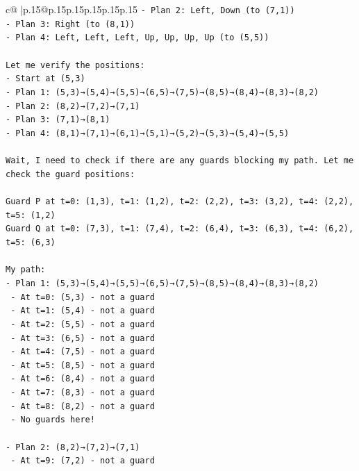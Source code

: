 \documentclass{article}
\begin{document}
{\begin{supertabular}{c@{$\;$}|p{.15\linewidth}@{}p{.15\linewidth}p{.15\linewidth}p{.15\linewidth}p{.15\linewidth}p{.15\linewidth}}
{{{\texttt{{-} Plan 2: Left, Down (to (7,1))} \\
\texttt{{-} Plan 3: Right (to (8,1))} \\
\texttt{{-} Plan 4: Left, Left, Left, Up, Up, Up, Up (to (5,5))} \\
\\ 
\texttt{Let me verify the positions:} \\
\texttt{{-} Start at (5,3)} \\
\texttt{{-} Plan 1: (5,3)→(5,4)→(5,5)→(6,5)→(7,5)→(8,5)→(8,4)→(8,3)→(8,2)} \\
\texttt{{-} Plan 2: (8,2)→(7,2)→(7,1)} \\
\texttt{{-} Plan 3: (7,1)→(8,1)} \\
\texttt{{-} Plan 4: (8,1)→(7,1)→(6,1)→(5,1)→(5,2)→(5,3)→(5,4)→(5,5)} \\
\\ 
\texttt{Wait, I need to check if there are any guards blocking my path. Let me check the guard positions:} \\
\\ 
\texttt{Guard P at t=0: (1,3), t=1: (1,2), t=2: (2,2), t=3: (3,2), t=4: (2,2), t=5: (1,2)} \\
\texttt{Guard Q at t=0: (7,3), t=1: (7,4), t=2: (6,4), t=3: (6,3), t=4: (6,2), t=5: (6,3)} \\
\\ 
\texttt{My path:} \\
\texttt{{-} Plan 1: (5,3)→(5,4)→(5,5)→(6,5)→(7,5)→(8,5)→(8,4)→(8,3)→(8,2)} \\
\texttt{  {-} At t=0: (5,3) {-} not a guard} \\
\texttt{  {-} At t=1: (5,4) {-} not a guard} \\
\texttt{  {-} At t=2: (5,5) {-} not a guard} \\
\texttt{  {-} At t=3: (6,5) {-} not a guard} \\
\texttt{  {-} At t=4: (7,5) {-} not a guard} \\
\texttt{  {-} At t=5: (8,5) {-} not a guard} \\
\texttt{  {-} At t=6: (8,4) {-} not a guard} \\
\texttt{  {-} At t=7: (8,3) {-} not a guard} \\
\texttt{  {-} At t=8: (8,2) {-} not a guard} \\
\texttt{  {-} No guards here!} \\
\\ 
\texttt{{-} Plan 2: (8,2)→(7,2)→(7,1)} \\
\texttt{  {-} At t=9: (7,2) {-} not a guard} \\
}}}
\end{supertabular}}
\end{document}

